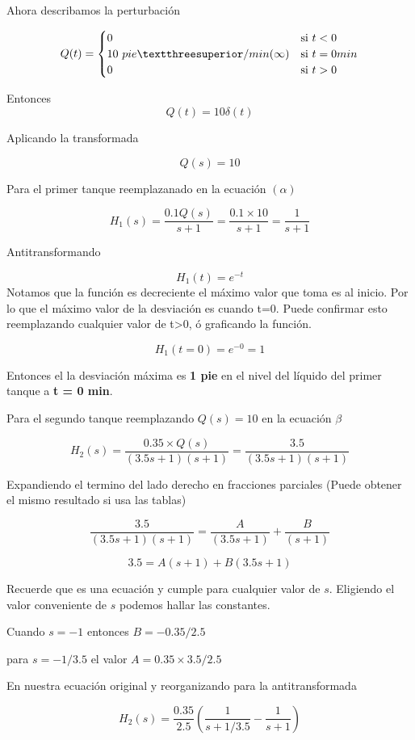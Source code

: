 \documentclass[
  letterpaper,
  DIV=11,
  numbers=noendperiod]{scrreprt}
\begin{document}
Ahora describamos la perturbación

\[
Q(t)=
\begin{cases}
   0 \space &\text{si } t<0\\
   10 \space\ pie³/min \space\space\space (\infty)&\text{si } t=0 \space min\\
   0 \space\ &\text{si } t>0 \\
\end{cases}
\]

Entonces \[
Q(t) = 10 \delta (t)
\]

Aplicando la transformada

\[
Q(s) = 10
\]

Para el primer tanque reemplazanado en la ecuación \((\alpha)\)

\[
H_1(s) = \frac{0.1Q(s)}{s+1}  = \frac{0.1\times 10}{s+1} =\frac{1}{s+1} 
\]

Antitransformando

\[
H_1(t) = e^{-t}
\] Notamos que la función es decreciente el máximo valor que toma es al
inicio. Por lo que el máximo valor de la desviación es cuando t=0. Puede
confirmar esto reemplazando cualquier valor de t\textgreater0, ó
graficando la función.

\[
H_1(t=0) = e^{-0} = 1
\]

Entonces el la desviación máxima es \textbf{1 pie} en el nivel del
líquido del primer tanque a \textbf{t = 0 min}.

Para el segundo tanque reemplazando \(Q(s)=10\) en la ecuación \(\beta\)

\[
H_2(s) = \frac{0.35\times Q(s)}{(3.5s+1)(s+1)} = \frac{3.5}{(3.5s+1)(s+1)}
\]

Expandiendo el termino del lado derecho en fracciones parciales (Puede
obtener el mismo resultado si usa las tablas)

\[
\frac{3.5}{(3.5s+1)(s+1)} = \frac{A}{(3.5s+1)}+\frac{B}{(s+1)}
\]

\[
3.5 = A(s+1)+B(3.5s+1)
\]

Recuerde que es una ecuación y cumple para cualquier valor de \(s\).
Eligiendo el valor conveniente de \(s\) podemos hallar las constantes.

Cuando \(s=-1\) entonces \(B = -0.35/2.5\)

para \(s=-1/3.5\) el valor \(A=0.35\times 3.5/2.5\)

En nuestra ecuación original y reorganizando para la antitransformada

\[
H_2(s)=\frac{0.35}{2.5}\left(\frac{1}{s+1/3.5}-\frac{1}{s+1}\right)
\]
\end{document}
